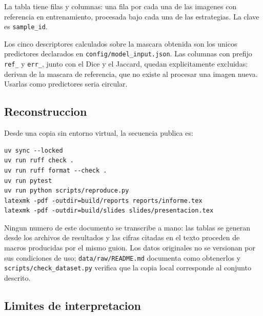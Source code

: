 \documentclass[11pt,a4paper]{article}
\begin{document}
La tabla tiene \NFilasTabla{} filas y \NColumnasTabla{} columnas: una fila por
cada una de las \NConMascara{} imagenes con referencia en entrenamiento,
procesada bajo cada una de las \NEstrategias{} estrategias. La clave es
\texttt{sample\_id}.

Los cinco descriptores calculados sobre la mascara obtenida son los unicos
predictores declarados en \texttt{config/model\_input.json}. Las columnas con
prefijo \texttt{ref\_} y \texttt{err\_}, junto con el Dice y el Jaccard,
quedan explicitamente excluidas: derivan de la mascara de referencia, que no
existe al procesar una imagen nueva. Usarlas como predictores seria circular.



\subsection{Reconstruccion}

Desde una copia sin entorno virtual, la secuencia publica es:

\begin{verbatim}
uv sync --locked
uv run ruff check .
uv run ruff format --check .
uv run pytest
uv run python scripts/reproduce.py
latexmk -pdf -outdir=build/reports reports/informe.tex
latexmk -pdf -outdir=build/slides slides/presentacion.tex
\end{verbatim}

Ningun numero de este documento se transcribe a mano: las tablas se generan
desde los archivos de resultados y las cifras citadas en el texto proceden de
macros producidas por el mismo guion. Los datos originales no se versionan por
sus condiciones de uso; \texttt{data/raw/README.md} documenta como obtenerlos
y \texttt{scripts/check\_dataset.py} verifica que la copia local corresponde al
conjunto descrito.

\subsection{Limites de interpretacion}
\end{document}
